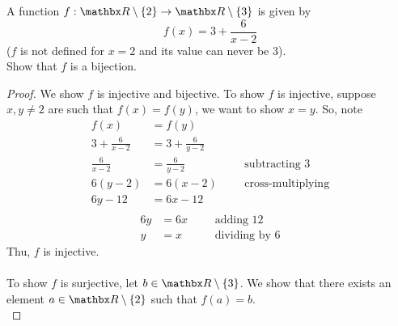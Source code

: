 \vspace*{1em}

\begin{example}
A function $f: \rr\setminus\set{2} \to \rr\setminus\set{3}$ is given by 
\[f(x) = 3 + \frac{6}{x - 2}\]
($f$ is not defined for $x = 2$ and its value can never be $3$).\\[0.5em]
Show that $f$ is a bijection.
\end{example}
\begin{proof}
We show $f$ is injective and bijective. To show $f$ is injective, suppose $x,y \neq 2$ are such that $f(x) = f(y)$, we want to show $x = y$. So, note
\begin{align*}
f(x) &= f(y)\\[0.5em]
3 + \frac{6}{x - 2} &= 3 + \frac{6}{y - 2}\\[0.5em]
\frac{6}{x - 2} &= \frac{6}{y - 2} &&& \text{subtracting $3$}\\[0.5em]
6(y - 2) &= 6(x - 2) &&& \text{cross-multiplying}\\[0.5em]
6y - 12 &= 6x - 12\\[0.5em]
\end{align*}
\begin{align*}
6y &= 6x &&& \text{adding $12$}\\[0.5em]
y &= x &&& \text{dividing by $6$}
\end{align*}
Thu, $f$ is injective.\\
\\
To show $f$ is surjective, let $b \in \rr\setminus\set{3}$. We show that there exists an element $a \in \rr\setminus\set{2}$ such that $f(a) = b$.\\


\end{proof}
